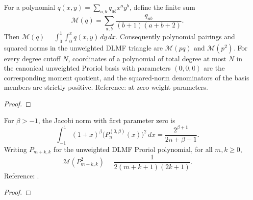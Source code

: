 \begin{supporting}
\begin{theorem}
\label{thm:proriol-polynomial-moments}
\leanok
For a polynomial $q(x,y)=\sum_{a,b}q_{ab}x^ay^b$, define the finite sum
\[
 \mathcal M(q)=\sum_{a,b}\frac{q_{ab}}{(b+1)(a+b+2)}.
\]
Then $\mathcal M(q)=\int_0^1\int_0^x q(x,y)\,dy\,dx$.
Consequently polynomial pairings and squared norms in the unweighted DLMF
triangle are $\mathcal M(pq)$ and $\mathcal M(p^2)$. For every degree cutoff
$N$, coordinates of a polynomial of total degree at most $N$ in the canonical
unweighted Proriol basis with parameters $(0,0,0)$ are the corresponding moment
quotient, and the squared-norm denominators of the basis members are strictly positive.
Reference: \cite[18.37.8]{dlmf} at zero weight parameters.
\end{theorem}
\begin{proof}
\leanok
\end{proof}

\begin{theorem}
\label{thm:proriol-unweighted-norm}
\leanok
For $\beta>-1$, the Jacobi norm with first parameter zero is
\[
 \int_{-1}^1(1+x)^\beta\bigl(P_n^{(0,\beta)}(x)\bigr)^2\,dx
 =\frac{2^{\beta+1}}{2n+\beta+1}.
\]
Writing $P_{m+k,k}$ for the unweighted DLMF Proriol polynomial, for all $m,k\ge0$,
\[
 \mathcal M(P_{m+k,k}^2)=\frac1{2(m+k+1)(2k+1)}.
\]
Reference: \cite[Table 18.3.1 and 18.37.8]{dlmf}.
\end{theorem}
\begin{proof}
\leanok
\end{proof}


\end{supporting}
